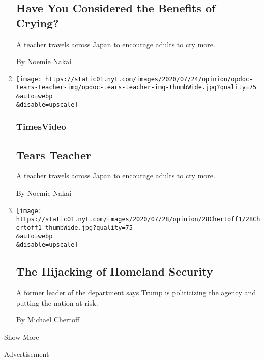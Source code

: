 \begin{enumerate}
  \hypertarget{have-you-considered-the-benefits-of-crying}{%
  \subsection{Have You Considered the Benefits of
  Crying?}\label{have-you-considered-the-benefits-of-crying}}

  A teacher travels across Japan to encourage adults to cry more.

  By Noemie Nakai
\item
  \href{/video/opinion/100000007247238/tears-teacher.html}{}

  \texttt{[image: https://static01.nyt.com/images/2020/07/24/opinion/opdoc-tears-teacher-img/opdoc-tears-teacher-img-thumbWide.jpg?quality=75\\\&auto=webp\\\&disable=upscale]}

  \hypertarget{timesvideo}{%
  \subsubsection{TimesVideo}\label{timesvideo}}

  \hypertarget{tears-teacher}{%
  \subsection{Tears Teacher}\label{tears-teacher}}

  A teacher travels across Japan to encourage adults to cry more.

  By Noemie Nakai
\item
  \href{/2020/07/28/opinion/homeland-security-portland-trump.html}{}

  \texttt{[image: https://static01.nyt.com/images/2020/07/28/opinion/28Chertoff1/28Chertoff1-thumbWide.jpg?quality=75\\\&auto=webp\\\&disable=upscale]}

  \hypertarget{the-hijacking-of-homeland-security}{%
  \subsection{The Hijacking of Homeland
  Security}\label{the-hijacking-of-homeland-security}}

  A former leader of the department says Trump is politicizing the
  agency and putting the nation at risk.

  By Michael Chertoff
\end{enumerate}

Show More

Advertisement

